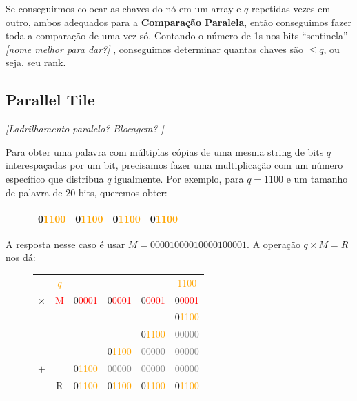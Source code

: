 Se conseguirmos colocar as chaves do nó em um array e $q$ repetidas vezes em
outro, ambos adequados para a \textbf{Comparação Paralela}, então conseguimos
fazer toda a comparação de uma vez só. Contando o número de 1s nos bits
``sentinela'' \textit{[nome melhor para dar?]} , conseguimos determinar quantas
chaves são $\leq q$, ou seja, seu rank.

\subsection{Parallel Tile}

\textit{[Ladrilhamento paralelo? Blocagem? ]}

Para obter uma palavra com múltiplas cópias de uma mesma string de bits $q$
interespaçadas por um bit, precisamos fazer uma multiplicação com um número
específico que distribua $q$ igualmente. Por exemplo, para $q=1100$ e um tamanho
de palavra de 20 bits, queremos obter:

\begin{figure}[h]
\bf \Large \centering
\begin{tabular}{|cccc|}
\hline
\textcolor{RawSienna}{0}\textcolor{Orange}{1100} &
\textcolor{RawSienna}{0}\textcolor{Orange}{1100} &
\textcolor{RawSienna}{0}\textcolor{Orange}{1100} & \textcolor{RawSienna}{0}\textcolor{Orange}{1100} \\
\hline
\end{tabular}
\end{figure}

A resposta nesse caso é usar $M=00001000010000100001$. A operação $q \times M = R$
nos dá:

\begin{figure}[h]
\bf \Large \centering
\begin{tabular}{cccccc}
& \textcolor{Orange}{$q$} & & & &
\textcolor{Orange}{\phantom{0}1100} \\
$\times$ & \textcolor{Red}{M} &
\textcolor{RawSienna}{0}\textcolor{Red}{0001} &
\textcolor{RawSienna}{0}\textcolor{Red}{0001} &
\textcolor{RawSienna}{0}\textcolor{Red}{0001} & \textcolor{RawSienna}{0}\textcolor{Red}{0001} \\
\hline
& & & & & 
\textcolor{RawSienna}{0}\textcolor{Orange}{1100} \\
& & & & 
\textcolor{RawSienna}{0}\textcolor{Orange}{1100} &
\textcolor{gray}{00000} \\
& & & 
\textcolor{RawSienna}{0}\textcolor{Orange}{1100} &
\textcolor{gray}{00000} &
\textcolor{gray}{00000} \\
$+$ & & 
\textcolor{RawSienna}{0}\textcolor{Orange}{1100} & 
\textcolor{gray}{00000} & 
\textcolor{gray}{00000} & 
\textcolor{gray}{00000} \\
\hline
& \textcolor{RawSienna}{R} &
\textcolor{RawSienna}{0}\textcolor{Orange}{1100} &
\textcolor{RawSienna}{0}\textcolor{Orange}{1100} &
\textcolor{RawSienna}{0}\textcolor{Orange}{1100} & \textcolor{RawSienna}{0}\textcolor{Orange}{1100} \\
\end{tabular}
\end{figure}

